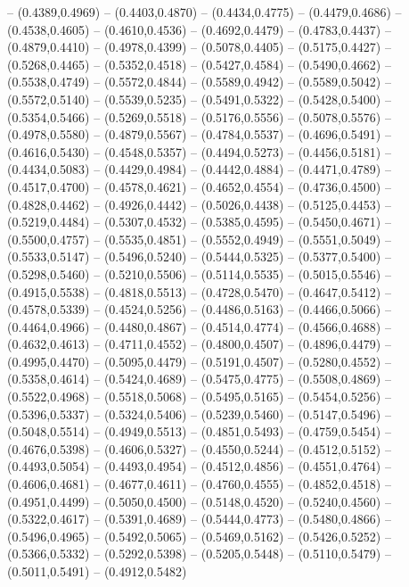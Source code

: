 {	-- (0.4389,0.4969)
	-- (0.4403,0.4870)
	-- (0.4434,0.4775)
	-- (0.4479,0.4686)
	-- (0.4538,0.4605)
	-- (0.4610,0.4536)
	-- (0.4692,0.4479)
	-- (0.4783,0.4437)
	-- (0.4879,0.4410)
	-- (0.4978,0.4399)
	-- (0.5078,0.4405)
	-- (0.5175,0.4427)
	-- (0.5268,0.4465)
	-- (0.5352,0.4518)
	-- (0.5427,0.4584)
	-- (0.5490,0.4662)
	-- (0.5538,0.4749)
	-- (0.5572,0.4844)
	-- (0.5589,0.4942)
	-- (0.5589,0.5042)
	-- (0.5572,0.5140)
	-- (0.5539,0.5235)
	-- (0.5491,0.5322)
	-- (0.5428,0.5400)
	-- (0.5354,0.5466)
	-- (0.5269,0.5518)
	-- (0.5176,0.5556)
	-- (0.5078,0.5576)
	-- (0.4978,0.5580)
	-- (0.4879,0.5567)
	-- (0.4784,0.5537)
	-- (0.4696,0.5491)
	-- (0.4616,0.5430)
	-- (0.4548,0.5357)
	-- (0.4494,0.5273)
	-- (0.4456,0.5181)
	-- (0.4434,0.5083)
	-- (0.4429,0.4984)
	-- (0.4442,0.4884)
	-- (0.4471,0.4789)
	-- (0.4517,0.4700)
	-- (0.4578,0.4621)
	-- (0.4652,0.4554)
	-- (0.4736,0.4500)
	-- (0.4828,0.4462)
	-- (0.4926,0.4442)
	-- (0.5026,0.4438)
	-- (0.5125,0.4453)
	-- (0.5219,0.4484)
	-- (0.5307,0.4532)
	-- (0.5385,0.4595)
	-- (0.5450,0.4671)
	-- (0.5500,0.4757)
	-- (0.5535,0.4851)
	-- (0.5552,0.4949)
	-- (0.5551,0.5049)
	-- (0.5533,0.5147)
	-- (0.5496,0.5240)
	-- (0.5444,0.5325)
	-- (0.5377,0.5400)
	-- (0.5298,0.5460)
	-- (0.5210,0.5506)
	-- (0.5114,0.5535)
	-- (0.5015,0.5546)
	-- (0.4915,0.5538)
	-- (0.4818,0.5513)
	-- (0.4728,0.5470)
	-- (0.4647,0.5412)
	-- (0.4578,0.5339)
	-- (0.4524,0.5256)
	-- (0.4486,0.5163)
	-- (0.4466,0.5066)
	-- (0.4464,0.4966)
	-- (0.4480,0.4867)
	-- (0.4514,0.4774)
	-- (0.4566,0.4688)
	-- (0.4632,0.4613)
	-- (0.4711,0.4552)
	-- (0.4800,0.4507)
	-- (0.4896,0.4479)
	-- (0.4995,0.4470)
	-- (0.5095,0.4479)
	-- (0.5191,0.4507)
	-- (0.5280,0.4552)
	-- (0.5358,0.4614)
	-- (0.5424,0.4689)
	-- (0.5475,0.4775)
	-- (0.5508,0.4869)
	-- (0.5522,0.4968)
	-- (0.5518,0.5068)
	-- (0.5495,0.5165)
	-- (0.5454,0.5256)
	-- (0.5396,0.5337)
	-- (0.5324,0.5406)
	-- (0.5239,0.5460)
	-- (0.5147,0.5496)
	-- (0.5048,0.5514)
	-- (0.4949,0.5513)
	-- (0.4851,0.5493)
	-- (0.4759,0.5454)
	-- (0.4676,0.5398)
	-- (0.4606,0.5327)
	-- (0.4550,0.5244)
	-- (0.4512,0.5152)
	-- (0.4493,0.5054)
	-- (0.4493,0.4954)
	-- (0.4512,0.4856)
	-- (0.4551,0.4764)
	-- (0.4606,0.4681)
	-- (0.4677,0.4611)
	-- (0.4760,0.4555)
	-- (0.4852,0.4518)
	-- (0.4951,0.4499)
	-- (0.5050,0.4500)
	-- (0.5148,0.4520)
	-- (0.5240,0.4560)
	-- (0.5322,0.4617)
	-- (0.5391,0.4689)
	-- (0.5444,0.4773)
	-- (0.5480,0.4866)
	-- (0.5496,0.4965)
	-- (0.5492,0.5065)
	-- (0.5469,0.5162)
	-- (0.5426,0.5252)
	-- (0.5366,0.5332)
	-- (0.5292,0.5398)
	-- (0.5205,0.5448)
	-- (0.5110,0.5479)
	-- (0.5011,0.5491)
	-- (0.4912,0.5482)
}
